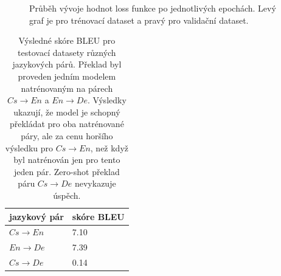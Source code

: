 \begin{figure}[H]
    \begin{center}
    \end{center}
	\caption{Průběh vývoje hodnot loss funkce po jednotlivých epochách. Levý graf je pro trénovací dataset a pravý pro validační dataset.}
\end{figure}

\begin{table}[H]
    \begin{center}
        \begin{tabular}{ll}
          \toprule
          jazykový pár & skóre BLEU \\
          \midrule
          $Cs\rightarrow En$ & 7.10 \\
          $En\rightarrow De$ & 7.39 \\
          $Cs\rightarrow De$ &  0.14 \\
          \bottomrule
        \end{tabular}
    \end{center}
	\caption{Výsledné skóre BLEU pro testovací datasety různých jazykových párů. Překlad byl proveden jedním modelem natrénovaným na párech $Cs\rightarrow En$ a $En\rightarrow De$. Výsledky ukazují, že model je schopný překládat pro oba natrénované páry, ale za cenu horšího výsledku pro $Cs\rightarrow En$, než když byl natrénován jen pro tento jeden pár. Zero-shot překlad páru $Cs\rightarrow De$ nevykazuje úspěch.}
	\label{table:resultsMulti}
\end{table}

